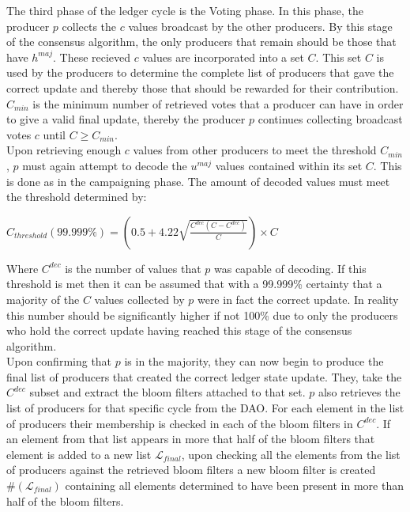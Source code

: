 The third phase of the ledger cycle is the Voting phase. In this phase, the producer $p$ collects the $c$ values broadcast by the other producers. By this stage of the consensus algorithm, the only producers that remain should be those that have $h^{maj}$. These recieved $c$ values are incorporated into a set $C$. This set $C$ is used by the producers to determine the complete list of producers that gave the correct update and thereby those that should be rewarded for their contribution. $C_{min}$ is the minimum number of retrieved votes that a producer can have in order to give a valid final update, thereby the producer $p$ continues collecting broadcast votes $c$ until $C \geq C_{min}$. \\


Upon retrieving enough $c$ values from other producers to meet the threshold $C_{min}$, $p$ must again attempt to decode the $u^{maj}$ values contained within its set $C$. This is done as in the campaigning phase. The amount of decoded values must meet the threshold determined by:  

\begin{center} 
$C_{threshold}(99.999\%) = \left( 0.5 + 4.22\sqrt{\frac{C^{dec}(C-C^{dec})}{C}}\right) \times C$
\end{center} 

Where $C^{dec}$ is the number of values that $p$ was capable of decoding. If this threshold is met then it can be assumed that with a 99.999\% certainty that a majority of the $C$ values collected by $p$ were in fact the correct update. In reality this number should be significantly higher if not 100\% due to only the producers who hold the correct update having reached this stage of the consensus algorithm. \\

Upon confirming that $p$ is in the majority, they can now begin to produce the final list of producers that created the correct ledger state update. They, take the $C^{dec}$ subset and extract the bloom filters attached to that set. $p$ also retrieves the list of producers for that specific cycle from the DAO. For each element in the list of producers their membership is checked in each of the bloom filters in $C^{dec}$. If an element from that list appears in more that half of the bloom filters that element is added to a new list $\mathcal{L}_{final}$, upon checking all the elements from the list of producers against the retrieved bloom filters a new bloom filter is created $\#(\mathcal{L}_{final})$ containing all elements determined to have been present in more than half of the bloom filters. 




